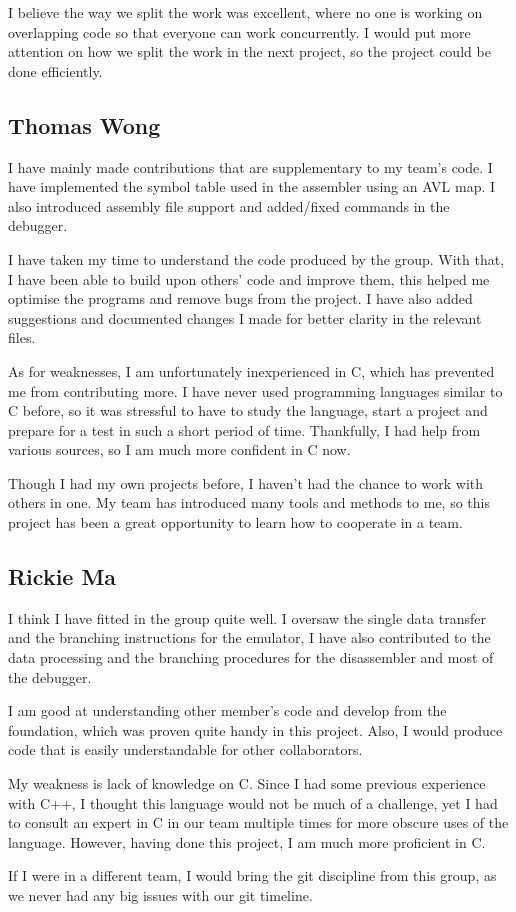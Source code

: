 \documentclass[11pt, a4paper]{article}
\begin{document}
I believe the way we split the work was excellent, where no one is working on overlapping code so that everyone can work concurrently. I would put more attention on how we split the work in the next project, so the project could be done efficiently. 
\subsection{Thomas Wong}
I have mainly made contributions that are supplementary to my team's code. I have implemented the symbol table used in the assembler using an AVL map. I also introduced assembly file support and added/fixed commands in the debugger.  

I have taken my time to understand the code produced by the group. With that, I have been able to build upon others' code and improve them, this helped me optimise the programs and remove bugs from the project. I have also added suggestions and documented changes I made for better clarity in the relevant files. 

As for weaknesses, I am unfortunately inexperienced in C, which has prevented me from contributing more. I have never used programming languages similar to C before, so it was stressful to have to study the language, start a project and prepare for a test in such a short period of time. Thankfully, I had help from various sources, so I am much more confident in C now. 

Though I had my own projects before, I haven't had the chance to work with others in one. My team has introduced many tools and methods to me, so this project has been a great opportunity to learn how to cooperate in a team. 
\subsection{Rickie Ma}
I think I have fitted in the group quite well. I oversaw the single data transfer and the branching instructions for the emulator, I have also contributed to the data processing and the branching procedures for the disassembler and most of the debugger.  

I am good at understanding other member's code and develop from the foundation, which was proven quite handy in this project. Also, I would produce code that is easily understandable for other collaborators. 

My weakness is lack of knowledge on C. Since I had some previous experience with C++, I thought this language would not be much of a challenge, yet I had to consult an expert in C in our team multiple times for more obscure uses of the language. However, having done this project, I am much more proficient in C.  

If I were in a different team, I would bring the git discipline from this group, as we never had any big issues with our git timeline. 
\end{document}
